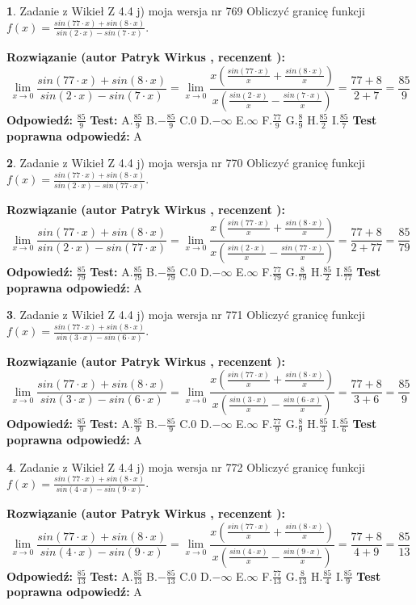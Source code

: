 \documentclass[12pt, a4paper]{article}
\theoremstyle{definition} %
\newtheorem{zad}{}
\newcommand{\zadStart}[1]{\begin{zad}#1\newline}
\newcommand{\zadStop}{\end{zad}}
\newcommand{\rozwStart}[2]{\noindent \textbf{Rozwiązanie (autor #1 , recenzent #2): }\newline}
\newcommand{\rozwStop}{\newline}
\newcommand{\odpStart}{\noindent \textbf{Odpowiedź:}\newline}
\newcommand{\odpStop}{\newline}
\newcommand{\testStart}{\noindent \textbf{Test:}\newline}
\newcommand{\testStop}{\newline}
\newcommand{\kluczStart}{\noindent \textbf{Test poprawna odpowiedź:}\newline}
\newcommand{\kluczStop}{\newline}
\begin{document}
\zadStart{Zadanie z Wikieł Z 4.4 j) moja wersja nr 769}
Obliczyć granicę funkcji $f(x)=\frac{sin(77\cdot x) +sin(8\cdot x)}{sin(2\cdot x) -sin(7\cdot x)}$.
\zadStop
\rozwStart{Patryk Wirkus}{}
$$\lim\limits_{x\to 0}\frac{sin(77\cdot x) +sin(8\cdot x)}{sin(2\cdot x) -sin(7\cdot x)}=\lim\limits_{x\to 0}\frac{x(\frac{sin(77\cdot x)}{x}+\frac{sin(8\cdot x)}{x})}{x(\frac{sin(2\cdot x)}{x}-\frac{sin(7\cdot x)}{x})}=\frac{77+8}{2+7} = \frac{85}{9}$$
\rozwStop
\odpStart
$\frac{85}{9}$
\odpStop
\testStart
A.$\frac{85}{9}$
B.$-\frac{85}{9}$
C.$0$
D.$-\infty$
E.$\infty$
F.$\frac{77}{9}$
G.$\frac{8}{9}$
H.$\frac{85}{2}$
I.$\frac{85}{7}$
\testStop
\kluczStart
A
\kluczStop



\zadStart{Zadanie z Wikieł Z 4.4 j) moja wersja nr 770}
Obliczyć granicę funkcji $f(x)=\frac{sin(77\cdot x) +sin(8\cdot x)}{sin(2\cdot x) -sin(77\cdot x)}$.
\zadStop
\rozwStart{Patryk Wirkus}{}
$$\lim\limits_{x\to 0}\frac{sin(77\cdot x) +sin(8\cdot x)}{sin(2\cdot x) -sin(77\cdot x)}=\lim\limits_{x\to 0}\frac{x(\frac{sin(77\cdot x)}{x}+\frac{sin(8\cdot x)}{x})}{x(\frac{sin(2\cdot x)}{x}-\frac{sin(77\cdot x)}{x})}=\frac{77+8}{2+77} = \frac{85}{79}$$
\rozwStop
\odpStart
$\frac{85}{79}$
\odpStop
\testStart
A.$\frac{85}{79}$
B.$-\frac{85}{79}$
C.$0$
D.$-\infty$
E.$\infty$
F.$\frac{77}{79}$
G.$\frac{8}{79}$
H.$\frac{85}{2}$
I.$\frac{85}{77}$
\testStop
\kluczStart
A
\kluczStop



\zadStart{Zadanie z Wikieł Z 4.4 j) moja wersja nr 771}
Obliczyć granicę funkcji $f(x)=\frac{sin(77\cdot x) +sin(8\cdot x)}{sin(3\cdot x) -sin(6\cdot x)}$.
\zadStop
\rozwStart{Patryk Wirkus}{}
$$\lim\limits_{x\to 0}\frac{sin(77\cdot x) +sin(8\cdot x)}{sin(3\cdot x) -sin(6\cdot x)}=\lim\limits_{x\to 0}\frac{x(\frac{sin(77\cdot x)}{x}+\frac{sin(8\cdot x)}{x})}{x(\frac{sin(3\cdot x)}{x}-\frac{sin(6\cdot x)}{x})}=\frac{77+8}{3+6} = \frac{85}{9}$$
\rozwStop
\odpStart
$\frac{85}{9}$
\odpStop
\testStart
A.$\frac{85}{9}$
B.$-\frac{85}{9}$
C.$0$
D.$-\infty$
E.$\infty$
F.$\frac{77}{9}$
G.$\frac{8}{9}$
H.$\frac{85}{3}$
I.$\frac{85}{6}$
\testStop
\kluczStart
A
\kluczStop



\zadStart{Zadanie z Wikieł Z 4.4 j) moja wersja nr 772}
Obliczyć granicę funkcji $f(x)=\frac{sin(77\cdot x) +sin(8\cdot x)}{sin(4\cdot x) -sin(9\cdot x)}$.
\zadStop
\rozwStart{Patryk Wirkus}{}
$$\lim\limits_{x\to 0}\frac{sin(77\cdot x) +sin(8\cdot x)}{sin(4\cdot x) -sin(9\cdot x)}=\lim\limits_{x\to 0}\frac{x(\frac{sin(77\cdot x)}{x}+\frac{sin(8\cdot x)}{x})}{x(\frac{sin(4\cdot x)}{x}-\frac{sin(9\cdot x)}{x})}=\frac{77+8}{4+9} = \frac{85}{13}$$
\rozwStop
\odpStart
$\frac{85}{13}$
\odpStop
\testStart
A.$\frac{85}{13}$
B.$-\frac{85}{13}$
C.$0$
D.$-\infty$
E.$\infty$
F.$\frac{77}{13}$
G.$\frac{8}{13}$
H.$\frac{85}{4}$
I.$\frac{85}{9}$
\testStop
\kluczStart
A
\kluczStop
\end{document}
